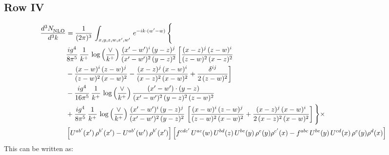 \documentclass[9pt]{article}
\numberwithin{equation}{section}
\begin{document}
\subsection{Row IV}
\begin{align}
    \frac{d^{3}N_{\rm NLO}^{\rm}}{d^{3}k}  & =   \frac{1}{(2\pi)^{3}}\,
    \int_{x,y,z,w,x',w'}\,e^{-ik\cdot (w^\prime-w)}\,\Bigg\{\notag \\
& \frac{ig^{4}}{8\pi^{5}}\,\frac{1}{k^{+}}\,\log{\left(\frac{\vee}{k^{+}}\right)}\,\frac{(x'-w')^{i}\,(y-z)^{j}}{(x'-w')^{2}\,(y-z)^{2}}\,\bigg[\frac{(x-z)^{j}\,(z-w)^{i}}{(z-w)^{2}\,(x-z)^{2}}\notag \\ & -\frac{(x-w)^{i}\,(z-w)^{j}}{(z-w)^{2}\,(x-w)^{2}}-\frac{(x-z)^{j}\,(x-w)^{i}}{(x-z)^{2}\,(x-w)^{2}}+\frac{\delta^{ij}}{2\,(z-w)^{2}}\bigg] \notag \\
& -\frac{ig^{4}}{16\pi^{5}}\,\frac{1}{k^{+}}\,\log{\left(\frac{\vee}{k^{+}}\right)} \,\frac{(x'-w')\cdot (y-z)}{(x'-w')^{2}\,(y-z)^{2}\,(z-w)^{2}}\notag \\
& + \frac{ig^{4}}{8\pi^{5}}\,\frac{1}{k^{+}}\,\log{\left(\frac{\vee}{k^{+}}\right)}\,\frac{(x'-w')^{i}\,(y-z)^{j}}{(x'-w')^{2}\,(y-z)^{2}}\,\left[\frac{(x-w)^{i}\,(z-w)^{j}}{(z-w)^{2}\,(x-w)^{2}}+\frac{(x-z)^{j}\,(x-w)^{i}}{2\, (x-z)^{2}\,(x-w)^{2}}\right]\Bigg\}\times\notag \\ &  \left[U^{ab'}(x')\,\rho^{b'}(x')-U^{ab'}(w')\,\rho^{b'}(x')\right] \left[f^{cdc'}\,U^{ac}(w)\,U^{bd}(z)\,U^{be}(y)\,\rho^{e}(y)\rho^{c'}(x)-f^{abc}\,U^{be}(y)\,U^{cd}(x)\,\rho^{e}(y)\rho^{d}(x)\right]
\end{align}
This can be written as:
\end{document}
